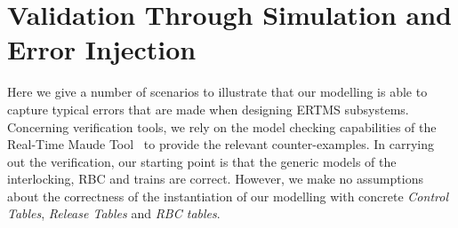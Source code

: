 \section{Validation Through Simulation and Error Injection}
\label{sec:validation}
 Here we give a number of scenarios to illustrate that our modelling
 is able to capture typical errors that are made when designing ERTMS
 subsystems. Concerning verification tools, we rely on the model
 checking capabilities of the Real-Time Maude
 Tool~\cite{olveczky2008real} to provide the relevant
 counter-examples. In carrying out the verification, our starting
 point is that the generic models of the interlocking, RBC and trains
 are correct. However, we make no assumptions about the correctness of
 the instantiation of our modelling with concrete \emph{Control
   Tables}, \emph{Release Tables} and \emph{RBC tables}.

